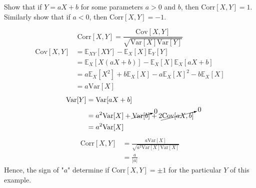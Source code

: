 \begin{example}
	Show that if $Y=aX+b$ for some parameters $a>0$ and $b$, then $\text{Corr}[X,Y]=1$. Similarly show that if $a<0$, then $\text{Corr}[X,Y]=-1$.
	
	\begin{equation}
		\text{Corr}[X,Y] = \frac{\text{Cov}[X,Y]}{\sqrt{\text{Var}[X]\text{Var}[Y]}}
	\end{equation}
	\begin{equation}
		\begin{split}
			\text{Cov}[X,Y] & = \mathbb{E}_{XY}[XY]-\mathbb{E}_X[X]\mathbb{E}_Y[Y]\\
			&= \mathbb{E}_X[X(aX+b)]-\mathbb{E}_X[X]\mathbb{E}_X[aX+b]\\
			&= a\mathbb{E}_X[X^2]+b\mathbb{E}_X[X]-a\mathbb{E}_X[X]^2-b\mathbb{E}_X[X]\\
			&=a\text{Var}[X]
		\end{split}
	\end{equation}
	\begin{equation}
		\begin{split}
			\text{Var}[Y] &= \text{Var}[aX+b]\\
			&= a^2\text{Var}[X]+\cancelto{0}{\text{Var}[b]}+2\cancelto{0}{\text{Cov}[aX,b]}\\
			& = a^2\text{Var}[X]
		\end{split}
	\end{equation}
	\begin{equation}
		\begin{split}
			\text{Corr}[X,Y] &= \frac{a\text{Var}[X]}{\sqrt{a^2\text{Var}[X]\text{Var}[X]}}\\
			&=\frac{a}{|a|}		
		\end{split}
	\end{equation}
	Hence, the sign of "$a$" determine if $\text{Corr}[X,Y]=\pm 1$ for the particular $Y$ of this example.
\end{example}

